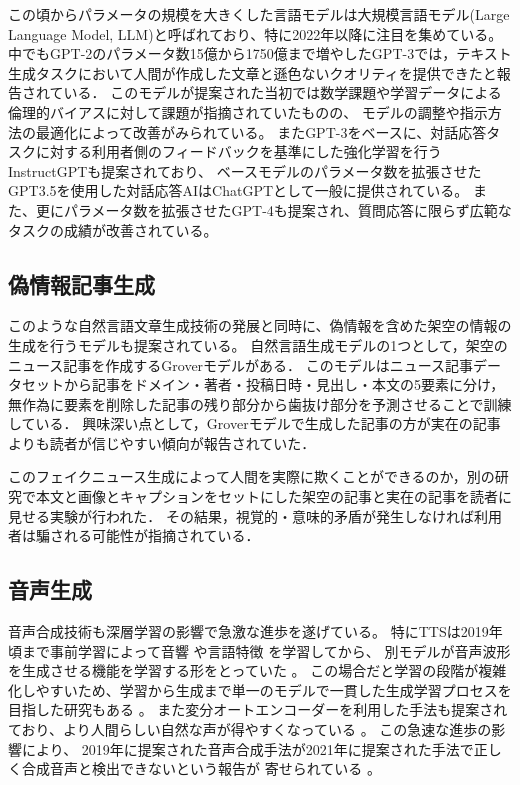 この頃からパラメータの規模を大きくした言語モデルは大規模言語モデル(Large Language Model, LLM)と呼ばれており、特に2022年以降に注目を集めている。 %
中でもGPT-2のパラメータ数15億から1750億まで増やしたGPT-3では，テキスト生成タスクにおいて人間が作成した文章と遜色ないクオリティを提供できたと報告されている\cite{brown2020language}．
このモデルが提案された当初では数学課題や学習データによる倫理的バイアスに対して課題が指摘されていた\cite{Floridi2020,Chan2023}ものの、
モデルの調整\cite{borchers-etal-2022-looking}や指示方法の最適化\cite{NEURIPS2022_8bb0d291,NEURIPS2022_9d560961}によって改善がみられている\cite{DBLP:conf/aied/AnLG23}。
またGPT-3をベースに、対話応答タスクに対する利用者側のフィードバックを基準にした強化学習を行うInstructGPTも提案されており\cite{NEURIPS2022_b1efde53}、
ベースモデルのパラメータ数を拡張させたGPT3.5を使用した対話応答AIはChatGPTとして一般に提供されている\cite{RAY2023121}。
また、更にパラメータ数を拡張させたGPT-4も提案され、質問応答に限らず広範なタスクの成績が改善されている\cite{openai2023gpt4}。

\subsection{偽情報記事生成}
\label{sec:generate}
このような自然言語文章生成技術の発展と同時に、偽情報を含めた架空の情報の生成を行うモデルも提案されている。
自然言語生成モデルの1つとして，架空のニュース記事を作成するGroverモデルがある\cite{DBLP:journals/corr/abs-1905-12616}．
このモデルはニュース記事データセットから記事をドメイン・著者・投稿日時・見出し・本文の5要素に分け，無作為に要素を削除した記事の残り部分から歯抜け部分を予測させることで訓練している．
興味深い点として，Groverモデルで生成した記事の方が実在の記事よりも読者が信じやすい傾向が報告されていた．

このフェイクニュース生成によって人間を実際に欺くことができるのか，別の研究で本文と画像とキャプションをセットにした架空の記事と実在の記事を読者に見せる実験が行われた．
その結果，視覚的・意味的矛盾が発生しなければ利用者は騙される可能性が指摘されている\cite{tan-etal-2020-detecting}．

\subsection{音声生成}
音声合成技術も深層学習の影響で急激な進歩を遂げている。
特にTTSは2019年頃まで事前学習によって音響 \cite{6639215,8461368}や言語特徴 \cite{vandenoord16_ssw}を学習してから、
別モデルが音声波形を生成させる機能を学習する形をとっていた \cite{vandenoord16_ssw,pmlr-v80-kalchbrenner18a}。
この場合だと学習の段階が複雑化しやすいため、学習から生成まで単一のモデルで一貫した生成学習プロセスを目指した研究もある \cite{wang17n_interspeech,ren2021fastspeech,donahue2021endtoend}。
また変分オートエンコーダーを利用した手法も提案されており、より人間らしい自然な声が得やすくなっている \cite{pmlr-v139-kim21f,https://doi.org/10.48550/arxiv.2205.04421}。
この急速な進歩の影響により、
2019年に提案された音声合成手法が2021年に提案された手法で正しく合成音声と検出できないという報告が
寄せられている \cite{yamagishi21_asvspoof,yu_icmece}。

